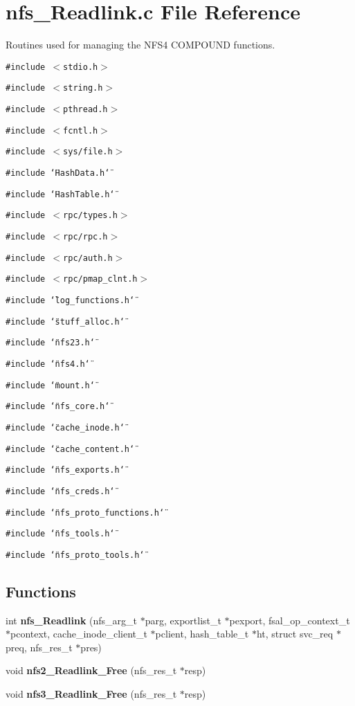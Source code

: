 \section{nfs\_\-Readlink.c File Reference}
\label{nfs__Readlink_8c}
Routines used for managing the NFS4 COMPOUND functions. 

{\tt \#include $<$stdio.h$>$}\par
{\tt \#include $<$string.h$>$}\par
{\tt \#include $<$pthread.h$>$}\par
{\tt \#include $<$fcntl.h$>$}\par
{\tt \#include $<$sys/file.h$>$}\par
{\tt \#include \char`\"{}Hash\-Data.h\char`\"{}}\par
{\tt \#include \char`\"{}Hash\-Table.h\char`\"{}}\par
{\tt \#include $<$rpc/types.h$>$}\par
{\tt \#include $<$rpc/rpc.h$>$}\par
{\tt \#include $<$rpc/auth.h$>$}\par
{\tt \#include $<$rpc/pmap\_\-clnt.h$>$}\par
{\tt \#include \char`\"{}log\_\-functions.h\char`\"{}}\par
{\tt \#include \char`\"{}stuff\_\-alloc.h\char`\"{}}\par
{\tt \#include \char`\"{}nfs23.h\char`\"{}}\par
{\tt \#include \char`\"{}nfs4.h\char`\"{}}\par
{\tt \#include \char`\"{}mount.h\char`\"{}}\par
{\tt \#include \char`\"{}nfs\_\-core.h\char`\"{}}\par
{\tt \#include \char`\"{}cache\_\-inode.h\char`\"{}}\par
{\tt \#include \char`\"{}cache\_\-content.h\char`\"{}}\par
{\tt \#include \char`\"{}nfs\_\-exports.h\char`\"{}}\par
{\tt \#include \char`\"{}nfs\_\-creds.h\char`\"{}}\par
{\tt \#include \char`\"{}nfs\_\-proto\_\-functions.h\char`\"{}}\par
{\tt \#include \char`\"{}nfs\_\-tools.h\char`\"{}}\par
{\tt \#include \char`\"{}nfs\_\-proto\_\-tools.h\char`\"{}}\par
\subsection*{Functions}
\begin{CompactItemize}
\item 
int {\bf nfs\_\-Readlink} (nfs\_\-arg\_\-t $\ast$parg, exportlist\_\-t $\ast$pexport, fsal\_\-op\_\-context\_\-t $\ast$pcontext, cache\_\-inode\_\-client\_\-t $\ast$pclient, hash\_\-table\_\-t $\ast$ht, struct svc\_\-req $\ast$preq, nfs\_\-res\_\-t $\ast$pres)
\item 
void {\bf nfs2\_\-Readlink\_\-Free} (nfs\_\-res\_\-t $\ast$resp)
\item 
void {\bf nfs3\_\-Readlink\_\-Free} (nfs\_\-res\_\-t $\ast$resp)
\end{CompactItemize}


